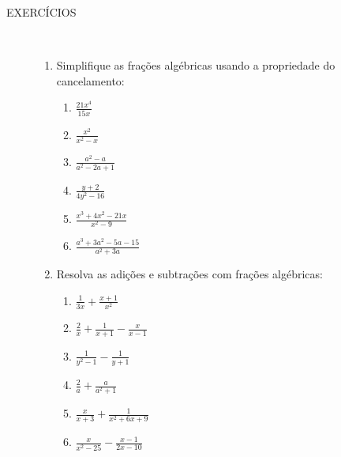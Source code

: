\begin{description}
\item [EXERCÍCIOS \thesubsection]~~

\begin{enumerate}[label=\textbf{\thesubsection.\arabic*}~~~~]
    \item Simplifique as frações algébricas usando a propriedade do cancelamento:
    
    \begin{multicols}{3}{\large
        \begin{enumerate} [label=\alph*)]
            \item $\frac{21x^4}{15x}$
            
            \item $\frac{x^2}{x^2-x}$
            
            \item $\frac{a^2-a}{a^2-2a+1}$
            
            \item $\frac{y+2}{4y^2-16}$
            
            \item $\frac{x^3+4x^2-21x}{x^2-9}$
            
            \item $\frac{a^3+3a^2-5a-15}{a^2+3a}$
        \end{enumerate}
    }\end{multicols}
    
    \item Resolva as adições e subtrações com frações algébricas:
    
    \begin{multicols}{3}{\large
        \begin{enumerate} [label=\alph*)]
            \item $\frac{1}{3x} + \frac{x+1}{x^2}$
            
            \item $\frac{2}{x} + \frac{1}{x+1} - \frac{x}{x-1}$
            
            \item $\frac{1}{y^2-1} - \frac{1}{y+1}$
            
            \item $\frac{2}{a} + \frac{a}{a^2+1}$
            
            \item $\frac{x}{x+3} + \frac{1}{x^2+6x+9}$
            
            \item $\frac{x}{x^2-25} - \frac{x-1}{2x-10}$
        \end{enumerate}
    }\end{multicols}
    

\end{enumerate}
\end{description}
